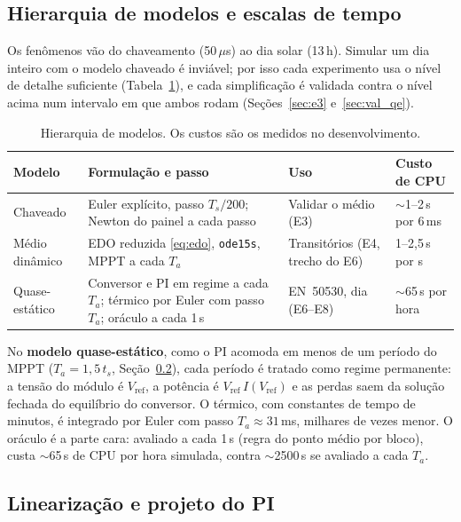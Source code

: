 \documentclass[3p,authoryear]{elsarticle}
\newcommand{\Vref}{V_{\mathrm{ref}}}
\begin{document}
\subsection{Hierarquia de modelos e escalas de tempo}
\label{sec:hierarquia}

Os fenômenos vão do chaveamento (50\,$\mu$s) ao dia solar (13\,h). Simular um dia inteiro
com o modelo chaveado é inviável; por isso cada experimento usa o nível de detalhe
suficiente (Tabela~\ref{tab:hierarquia}), e cada simplificação é validada contra o nível
acima num intervalo em que ambos rodam (Seções~\ref{sec:e3} e~\ref{sec:val_qe}).

\begin{table}[!htbp]
\centering\small
\begin{tabularx}{\linewidth}{l X l l}
\toprule
Modelo & Formulação e passo & Uso & Custo de CPU \\
\midrule
Chaveado & Euler explícito, passo $T_s/200$; Newton do painel a cada passo &
Validar o médio (E3) & $\sim$1--2\,s por 6\,ms \\
Médio dinâmico & EDO reduzida \eqref{eq:edo}, \texttt{ode15s}, MPPT a cada $T_a$ &
Transitórios (E4, trecho do E6) & 1--2,5\,s por s \\
Quase-estático & Conversor e PI em regime a cada $T_a$; térmico por Euler com passo $T_a$;
oráculo a cada 1\,s & EN~50530, dia (E6--E8) & $\sim$65\,s por hora \\
\bottomrule
\end{tabularx}
\caption{Hierarquia de modelos. Os custos são os medidos no desenvolvimento.}
\label{tab:hierarquia}
\end{table}

No \textbf{modelo quase-estático}, como o PI acomoda em menos de um período do MPPT
($T_a = 1{,}5\,t_s$, Seção~\ref{sec:pi}), cada período é tratado como regime permanente: a
tensão do módulo é $\Vref$, a potência é $\Vref\, I(\Vref)$ e as perdas saem da solução
fechada do equilíbrio do conversor. O térmico, com constantes de tempo de minutos, é
integrado por Euler com passo $T_a \approx 31$\,ms, milhares de vezes menor. O oráculo é a
parte cara: avaliado a cada 1\,s (regra do ponto médio por bloco), custa $\sim$65\,s de CPU
por hora simulada, contra $\sim$2500\,s se avaliado a cada $T_a$.

\subsection{Linearização e projeto do PI}
\label{sec:pi}
\end{document}
